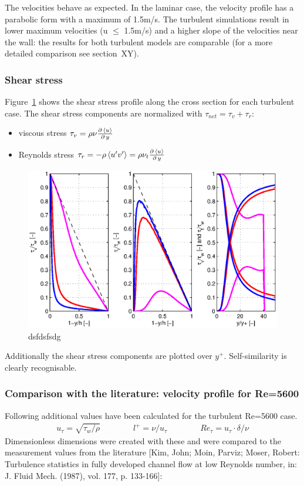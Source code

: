 \noii The velocities behave as expected. In the laminar case, the velocity profile has a parabolic form with a maximum of 1.5m/s. The turbulent simulations result in lower maximum velocities (u $\le$ 1.5m/s) and a higher slope of the velocities near the wall: the results for both turbulent models are comparable (for a more detailed comparison see section~XY).

\subsubsection*{Shear stress}

Figure~\ref{fig:channel-tau} shows the shear stress profile along the cross section for each turbulent case. The shear stress components are normalized with $\tau_{net}=\tau_v+\tau_r$:

\begin{itemize}
\item viscous stress $\tau_v=\rho\nu\frac{\partial\,\left\langle u \right\rangle}{\partial\,y}$
\item Reynolds stress $\tau_r=-\rho\left\langle u' v' \right\rangle=\rho\nu_t\frac{\partial\,\left\langle u \right\rangle}{\partial\,y}$
\end{itemize}

\begin{figure}[!htb]
\centering
\includegraphics[width=1.0\textwidth]{FIGURES/tau.eps}
\caption{dsfdsfsdg}
\label{fig:channel-tau}
\end{figure} 

\noindent Additionally the shear stress components are plotted over $y^+$. Self-similarity is clearly recognisable.



\subsubsection{Comparison with the literature: velocity profile for Re=5600}\label{sec:lit}
Following additional values have been calculated for the turbulent Re=5600 case.
\begin{align}
u_\tau=\sqrt{\tau_w/\rho}
\qquad\qquad
l^+=\nu/u_\tau
\qquad\qquad
Re_\tau=u_\tau\cdot\delta/\nu
\end{align}
Dimensionless dimensions were created with these and were compared to the measurement values from the literature [Kim, John; Moin, Parviz; Moser, Robert: Turbulence statistics in fully developed channel flow at low Reynolds number, in: J. Fluid Mech. (1987), vol. 177, p. 133-166]:

